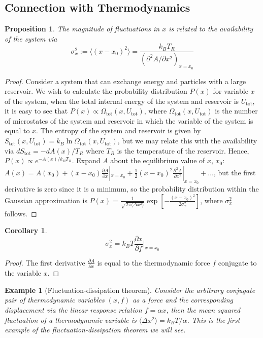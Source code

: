 \documentclass[a4paper]{article}
\newtheorem{eg}{Example}[section]
\theoremstyle{new}
\newtheorem{prop}{Proposition}[section]
\newtheorem{cor}{Corollary}[section]
\begin{document}
\subsection{Connection with Thermodynamics}
\begin{prop}
The magnitude of fluctuations in $x$ is related to the availability of the system via
\begin{equation}
\sigma_x^2:=\langle(x-x_0)^2\rangle=\frac{k_BT_R}{(\partial^2A/\partial x^2)_{x=x_0}}\label{fluctuation}
\end{equation}
\end{prop}
\begin{proof}
Consider a system that can exchange energy and particles with a large reservoir. We wish to calculate the probability distribution $P(x)$ for variable $x$ of the system, when the total internal energy of the system and reservoir is $U_{\text{tot}}$, it is easy to see that $P(x)\propto\Omega_{\text{tot}}(x,U_{\text{tot}})$, where $\Omega_{\text{tot}}(x,U_{\text{tot}})$ is the number of microstates of the system and reservoir in which the variable of the system is equal to $x$. The entropy of the system and reservoir is given by $S_{\text{tot}}(x,U_{\text{tot}})=k_B\ln\Omega_{\text{tot}}(x,U_{\text{tot}})$, but we may relate this with the availability via $dS_{\text{tot}}=-dA(x)/T_R$ where $T_R$ is the temperature of the reservoir. Hence, $P(x)\propto e^{-A(x)/k_BT_R}$. Expand $A$ about the equilibrium value of $x$, $x_0$: $A(x)=A(x_0)+(x-x_0)\frac{\partial A}{\partial x}|_{x=x_0}+\frac{1}{2}(x-x_0)^2\frac{\partial^2A}{\partial x^2}|_{x=x_0}+\dots$, but the first derivative is zero since it is a minimum, so the probability distribution within the Gaussian approximation is $P(x)=\frac{1}{\sqrt{2\pi\langle\Delta x^2\rangle}}\exp[-\frac{(x-x_0)^2}{2\sigma_x^2}]$, where $\sigma_x^2$ follows.
\end{proof}
\begin{cor}
\begin{equation}
\sigma_x^2=k_BT\frac{\partial x}{\partial f}\bigg|_{x=x_0}\label{fluctuation2}
\end{equation}
\end{cor}
\begin{proof}
The first derivative $\frac{\partial A}{\partial x}$ is equal to the thermodynamic force $f$ conjugate to the variable $x$. 
\end{proof}
\begin{eg}[Fluctuation-dissipation theorem]
Consider the arbitrary conjugate pair of thermodynamic variables $(x,f)$ as a force and the corresponding displacement via the linear response relation $f=\alpha x$, then the mean squared fluctuation of a thermodynamic variable is $\langle\Delta x^2\rangle=k_BT/\alpha$. This is the first example of the fluctuation-dissipation theorem we will see.
\end{eg}
\end{document}
